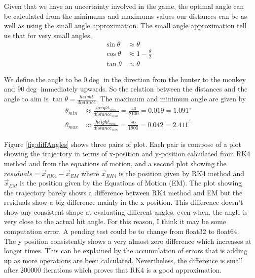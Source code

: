 Given that we have an uncertainty involved in the game, the optimal angle can be calculated from the minimums and maximums values our distances can be as well as using the small angle approximation. The small angle approximation tell us that for very small angles,
\begin{align*}
    \sin{\theta} &\approx \theta \\
    \cos{\theta} &\approx 1-\frac{\theta}{2}\\
    \tan{\theta} &\approx \theta
\end{align*}

We define the angle to be $0\deg$ in the direction from the hunter to the monkey and $90\deg$ immediately upwards. So the relation between the distances and the angle to aim is
$\tan{\theta}=\frac{height}{distance}$. The maximum and minimum angle are given by 
\begin{align*}
    \theta_{min} &\approx \frac{height_{min}}{distance_{max}} = \frac{40}{2100} = 0.019 = 1.091^\circ \\
    \theta_{max} &\approx \frac{height_{max}}{distance_{min}} = \frac{80}{1900} = 0.042 = 2.411^\circ
\end{align*}

Figure \ref{fig:diffAngles} shows three pairs of plot. Each pair is compose of a plot showing the trajectory in terms of x-position and y-position calculated from RK4 method and from the equations of motion, and a second plot showing the $residuals = \vec{x}_{RK4}-\vec{x}_{EM}$  where $\vec{x}_{RK4}$ is the position given by RK4 method and $\vec{x}_{EM}$ is the position given by the Equations of Motion (EM). The plot showing the trajectory barely shows a difference between RK4 method and EM but the residuals show a big difference mainly in the x position. This difference doesn't show any consistent shape at evaluating different angles, even when, the angle is very close to the actual hit angle. For this reason, I think it may be some computation error. A pending test could be to change from float32 to float64. The y position consistently shows a very almost zero difference which increases at longer times. This can be explained by the accumulation of errors that is adding up as more operations are been calculated. Nevertheless, the difference is small after $200000$ iterations which proves that RK4 is a good approximation.

